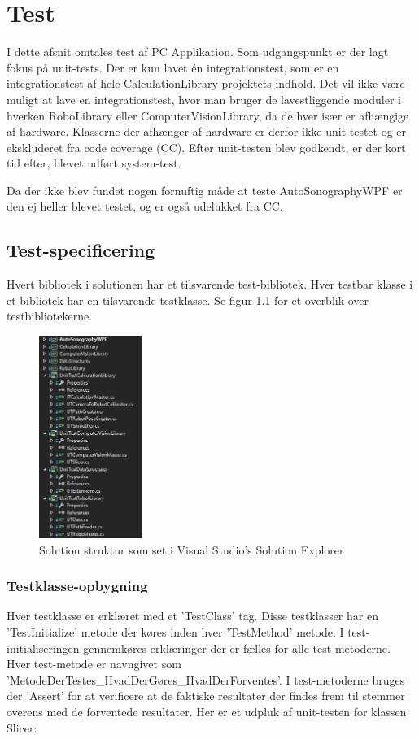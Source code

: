 \chapter{Test}\label{Test}
I dette afsnit omtales test af PC Applikation. Som udgangspunkt er der lagt fokus på unit-tests. Der er kun lavet én integrationstest, som er en integrationstest af hele CalculationLibrary-projektets indhold. Det vil ikke være muligt at lave en integrationstest, hvor man bruger de lavestliggende moduler i hverken RoboLibrary eller ComputerVisionLibrary, da de hver især er afhængige af hardware. Klasserne der afhænger af hardware er derfor ikke unit-testet og er ekskluderet fra code coverage (CC). 
Efter unit-testen blev godkendt, er der kort tid efter, blevet udført system-test.

Da der ikke blev fundet nogen fornuftig måde at teste AutoSonographyWPF er den ej heller blevet testet, og er også udelukket fra CC.

\section{Test-specificering}
Hvert bibliotek i solutionen har et tilsvarende test-bibliotek. Hver testbar klasse i et bibliotek har en tilsvarende testklasse. Se figur \ref{SolutionStructure} for et overblik over testbibliotekerne.

\begin{figure}[H]
    \centering
    \includegraphics[width=0.3\textwidth]{figurer/d/Test/solution_overview}
    \caption{Solution struktur som set i Visual Studio's Solution Explorer}
    \label{SolutionStructure}
\end{figure}

\newpage
\subsection{Testklasse-opbygning}
Hver testklasse er erklæret med et 'TestClass' tag. Disse testklasser har en 'TestInitialize' metode der køres inden hver 'TestMethod' metode. I test-initialiseringen gennemkøres erklæringer der er fælles for alle test-metoderne. Hver test-metode er navngivet som 'MetodeDerTestes\_HvadDerGøres\_HvadDerForventes'. I test-metoderne bruges der 'Assert' for at verificere at de faktiske resultater der findes frem til stemmer overens med de forventede resultater. Her er et udpluk af unit-testen for klassen Slicer:

